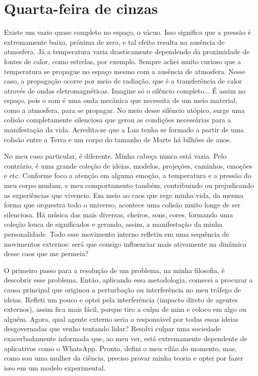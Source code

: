 \chapter{Quarta-feira de cinzas}\label{capitulo3}

Existe um vazio quase completo no espaço, o vácuo. Isso significa que a pressão é extremamente baixa, próxima de zero, e tal efeito resulta na ausência de atmosfera. Já a temperatura varia drasticamente dependendo da proximidade de fontes de calor, como estrelas, por exemplo. Sempre achei muito curioso que a temperatura se propague no espaço mesmo com a ausência de atmosfera. Nesse caso, a propagação ocorre por meio de radiação, que é a transferência de calor através de ondas eletromagnéticas. Imagine só o silêncio completo... É assim no espaço, pois o som é uma onda mecânica que necessita de um meio material, como a atmosfera, para se propagar. No meio desse silêncio utópico, surge uma colisão completamente silenciosa que gerou as condições necessárias para a manifestação da vida. Acredita-se que a Lua tenha se formado a partir de uma colisão entre a Terra e um corpo do tamanho de Marte há bilhões de anos.

No meu caso particular, é diferente. Minha cabeça nunca está vazia. Pelo contrário, é uma grande coleção de ideias, modelos, projeções, caminhos, emoções e etc. Conforme foco a atenção em alguma emoção, a temperatura e a pressão do meu corpo mudam, e meu comportamento também, contribuindo ou prejudicando as experiências que vivencio. Em meio ao caos que rege minha vida, da mesma forma que orquestra todo o universo, acontece uma colisão muito longe de ser silenciosa. Há música das mais diversas, cheiros, sons, cores, formando uma coleção louca de significados e gerando, assim, a manifestação da minha personalidade. Todo esse movimento interno refletiu em uma sequência de movimentos externos: será que consigo influenciar mais ativamente na dinâmica desse caos que me permeia?

O primeiro passo para a resolução de um problema, na minha filosofia, é descobrir esse problema. Então, aplicando essa metodologia, comecei a procurar a causa principal que originou a perturbação ou interferência no meu tráfego de ideias. Refleti um pouco e optei pela interferência (impacto direto de agentes externos), assim fica mais fácil, porque tiro a culpa de mim e coloco em algo ou alguém. Agora, qual agente externo seria o responsável por todas essas ideias desgovernadas que venho tentando lidar? Resolvi culpar uma sociedade exacerbadamente informada que, ao meu ver, está extremamente dependente de aplicativos como o WhatsApp. Pronto, defini o meu vilão do momento, mas, como sou uma mulher da ciência, preciso provar minha teoria e optei por fazer isso em um modelo experimental.

